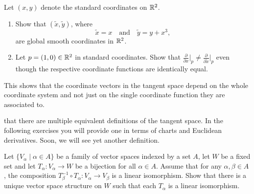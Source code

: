 \begin{exercise}
	Let $(x,y)$ denote the standard coordinates on $\mathbb{R}^2$.
	\begin{enumerate}
		\item Show that $(\widetilde{x}, \widetilde{y})$, where
		      \begin{equation}
			      \widetilde{x} = x
			      \quad\mbox{and}\quad
			      \widetilde{y} = y + x^3,
		      \end{equation}
		      are global smooth coordinates in $\mathbb{R}^2$.
		\item Let $p=(1,0)\in\mathbb{R}^2$ in standard coordinates.
		      Show that $\frac{\partial}{\partial x}\Big|_p \neq \frac{\partial}{\partial \widetilde x}\Big|_p$ even though the respective coordinate functions are identically equal.
	\end{enumerate}
	This shows that the coordinate vectors in the tangent space depend on the whole coordinate system and not just on the single coordinate function they are associated to.
\end{exercise}

 that there are multiple equivalent definitions of the tangent space. In the following exercises you will provide one in terms of charts and Euclidean derivatives.
Soon, we will see yet another definition.

\begin{exercise}\label{exe:vsstruct}
	Let $\{V_\alpha \mid \alpha\in A\}$ be a family of vector spaces indexed by a set $A$, let $W$ be a fixed set and let $T_\alpha: V_\alpha\to W$ be a bijection for all $\alpha\in A$.
	Assume that for any $\alpha, \beta \in A$, the composition $T_\beta^{-1}\circ T_\alpha : V_\alpha \to V_\beta$ is a linear isomorphism.
	Show that there is a unique vector space structure on $W$ such that each $T_\alpha$ is a linear isomorphism.
\end{exercise}

